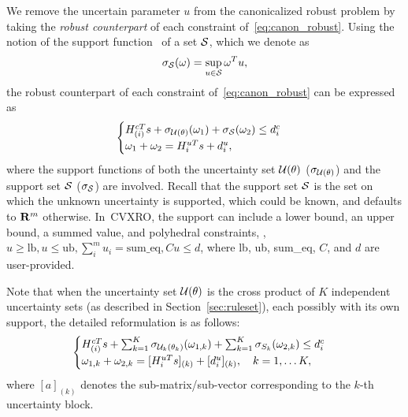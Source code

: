 We remove the uncertain parameter $u$ from the canonicalized robust problem by taking the {\it robust counterpart} of each constraint of~\eqref{eq:canon_robust}. 
Using the notion of the support function~\cite[Section 13]{rockafellar1970convex} of a set $\mathcal{S}$, which we denote as 
\begin{equation*}
    \sigma_{\mathcal{S}}(\omega) = \sup\limits_{u\in \mathcal{S}} \omega^Tu,
\end{equation*}
the robust counterpart of each constraint of~\eqref{eq:canon_robust} can be expressed as
\begin{equation*}
    \begin{cases}
    H^{cT}_{(i)}s + \sigma_{{\mathcal{U}}(\theta)}(\omega_1) + \sigma_{\mathcal{S}}(\omega_2)  \leq d_i^c \\
    \omega_1 + \omega_2 = H_i^{uT}s + d_i^u,
    \end{cases}
\end{equation*}
where the support functions of both the uncertainty set ${\mathcal{U}}(\theta)$ ($\sigma_{{\mathcal{U}}(\theta)}$) and the support set $\mathcal{S}$ ($\sigma_{\mathcal{S}}$) are involved. 
Recall that the support set $\mathcal{S}$ is the set on which the unknown uncertainty is supported, which could be known, and defaults to ${\mathbf R}^m$ otherwise. 
In~\gls{CVXRO}, the support can include a lower bound, an upper bound, a summed value, and polyhedral constraints, \ie, 
$u\geq \text{lb}, u\leq \text{ub}, \sum_i^m u_i = \text{sum\_eq}, Cu\leq d$, where lb, ub, sum\_eq, $C$, and $d$ are user-provided. 

Note that when the uncertainty set ${\mathcal{U}}(\theta)$ is the cross product of $K$ independent uncertainty sets (as described in Section~\ref{sec:ruleset}),  each possibly with its own support, the detailed reformulation is as follows:
\begin{equation}
  \label{eq:diff_sets}
    \begin{cases}
    H^{cT}_{(i)}s + \sum_{k=1}^K\sigma_{{\mathcal{U}}_k(\theta_k)}(\omega_{1,k}) + \sum_{k=1}^K\sigma_{S_k}(\omega_{2,k})  \leq d_i^c \\
    \omega_{1,k} + \omega_{2,k} = [H_i^{uT}s]_{(k)} + [d_i^u]_{(k)},\quad k = 1,\dots K,
    \end{cases}
\end{equation}
where $[a]_{(k)}$ denotes the sub-matrix/sub-vector corresponding to the $k$-th uncertainty block.

